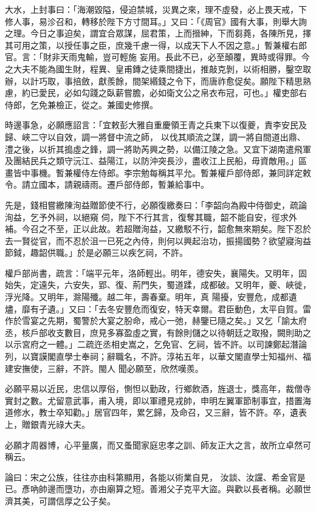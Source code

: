 \begin{pinyinscope}
 大水，上封事曰：「海潮毀隘，侵迫禁城，災異之來，理不虛發，必上畏天戒，下修人事，易沴召和，轉移於陛下方寸間耳。」又曰：「《周官》國有大事，則舉大詢之理。今日之事迫矣，謂宜合眾謀，屈君策，上而搢紳，下而芻蕘，各陳所見，擇其可用之策，以授任事之臣，庶幾千慮一得，以成天下人不因之意。」暫兼權右郎官。言：「財非天雨鬼輸，豈可輕施
 妄用。長此不已，必至顛覆，異時或得罪。今之大夫不能為國生財，程異、皇甫鏄之徒乘間捷出，推敲克剝，以術相勝，鑿空取辦，以計巧取，事掊斂，獻羨餘，間架緡錢之令下，而唐祚愈促矣。願陛下精思熟慮，約已愛民，必如勾踐之臥薪嘗膽，必如衛文公之帛衣布冠，可也。」權吏部右侍郎，乞免兼檢正，從之。兼國史修撰。



 時邊事急，必願應詔言：「宜敕彭大雅自重慶領王青之兵東下以復夔，責李安民及歸、峽二守以自效，調一將督中流之師，
 以伐其順流之謀，調一將自間道出鼎、澧之後，以折其搗虛之鋒，調一將助芮興之勢，以備江陵之急。又宜下湖南遣飛軍及團結民兵之類守沅江、益陽江，以防沖突長沙，盡收江上民船，毋資敵用。」區畫皆中事機。暫兼權侍左侍郎。李宗勉每稱其平允。暫兼權戶部侍郎，兼同詳定敕令。請立國本，請親禱雨。遷戶部侍郎，暫兼給事中。



 先是，錢相嘗繳陳洵益贈節使不行，必願復繳奏曰：「李韶向為殿中侍御史，疏論洵益，乞予外祠，以絕窺
 伺，陛下不行其言，復奪其職，韶不能自安，徑求外補。今召之不至，正以此故。若超贈洵益，又繳駁不行，韶愈無來期矣。陛下忍於去一賢從官，而不忍於沮一已死之內侍，則何以興起治功，振揚國勢？欲望寢洵益節鉞，趣韶供職。」於是必願三以疾乞祠，不許。



 權戶部尚書，疏言：「端平元年，洛師輕出。明年，德安失，襄陽失。又明年，固始失，定遠失，六安失，郢、復、荊門失，蜀道蹂，成都破。又明年，夔、峽徙，浮光降。又明年，滁陽殲。越二年，壽春棄。明年，真
 陽擾，安豐危，成都遺燼，靡有孑遺。」又曰：「去冬安豐危而復安，特天幸爾。君臣動色，太平自賀。雷作於雪宴之先期，蜀警於大宴之朌命，戒心一弛，赫鑒已隨之矣。」又乞「諭太府丞，核戶部收支數目，庶見多寡盈虛之實，有餘則儲之以待朝廷之取撥，闕則助之以示宮府之一體。」二疏迕丞相史嵩之，乞免官、乞祠，皆不許。以司諫鄭起潛論列，以寶謨閣直學士奉祠；辭職名，不許。淳祐五年，以華文閣直學士知福州、福建安撫使，三辭，不許。閩人
 聞必願至，欣然嘆羨。



 必願平易以近民，忠信以厚俗，惻怛以勤政，行鄉飲酒，旌退士，獎高年，裁僧寺實封之數。尤留意武事，甫入境，即以軍禮見戎帥，申明左翼軍節制事宜，措置海道修水，教士卒知勸。」居官四年，累乞歸，及命召，又三辭，皆不許。卒，遺表上，贈銀青光祿大夫。



 必願才周器博，心平量廣，而又蚤聞家庭忠孝之訓、師友正大之言，故所立卓然可稱云。



 論曰：宋之公族，往往亦由科第顯用，各能以術業自見，
 汝談、汝讜、希金官是已。彥吶帥邊而墮功，亦由廟算之短。善湘父子克平大盜。與歡以長者稱。必願世濟其美，可謂信厚之公子矣。



\end{pinyinscope}